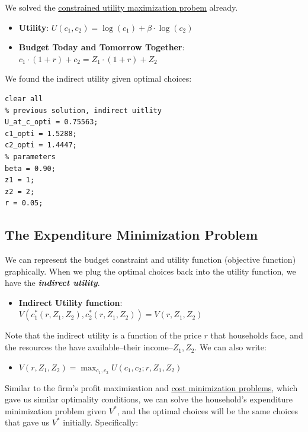 \documentclass[
]{book}
\providecommand{\tightlist}{%
  \setlength{\itemsep}{0pt}\setlength{\parskip}{0pt}}
\begin{document}
We solved the \href{https://math4econ.github.io/opti_hh_constrained_brsv/household_c1_c2_constrained.html}{constrained utility maximization
probem}
already.

\begin{itemize}
\item
  \textbf{Utility}: \(U(c_1 ,c_2 )=\log (c_1 )+\beta \cdot \log (c_2 )\)
\item
  \textbf{Budget Today and Tomorrow Together}:
  \(c_1 \cdot (1+r)+c_2 =Z_1 \cdot (1+r)+Z_2\)
\end{itemize}

We found the indirect utility given optimal choices:

\begin{verbatim}
clear all
% previous solution, indirect uitlity
U_at_c_opti = 0.75563;
c1_opti = 1.5288;
c2_opti = 1.4447;
% parameters
beta = 0.90;
z1 = 1;
z2 = 2;
r = 0.05;
\end{verbatim}

\hypertarget{the-expenditure-minimization-problem}{%
\subsection{The Expenditure Minimization Problem}\label{the-expenditure-minimization-problem}}

We can represent the budget constraint and utility function (objective
function) graphically. When we plug the optimal choices back into the
utility function, we have the \textbf{\emph{indirect utility}}.

\begin{itemize}
\tightlist
\item
  \textbf{Indirect Utility function}:
  \(V(c_1^* (r,Z_1 ,Z_2 ),c_2^* (r,Z_1 ,Z_2 ))=V(r,Z_1 ,Z_2 )\)
\end{itemize}

Note that the indirect utility is a function of the price \(r\) that
households face, and the resources the have available--their
income--\(Z_1 ,Z_2\). We can also write:

\begin{itemize}
\tightlist
\item
  \(\displaystyle V(r,Z_1 ,Z_2 )=\max_{c_1 ,c_2 } U(c_1 ,c_2 ;r,Z_1 ,Z_2 )\)
\end{itemize}

Similar to the firm's profit maximization and \href{https://math4econ.github.io/opti_firm_constrained/profit_maximize.html}{cost minimization
problems},
which gave us similar optimality conditions, we can solve the
household's expenditure minimization problem given \(V^*\), and the
optimal choices will be the same choices that gave us \(V^*\) initially.
Specifically:
\end{document}
